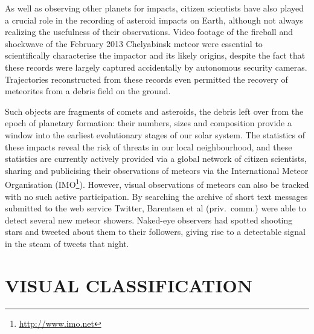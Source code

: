 \documentclass{ar2e}
\begin{document}

As well as observing other planets for impacts, citizen scientists have also
played a crucial role in the recording of asteroid impacts on Earth, although
not always realizing the usefulness of their observations. Video footage of
the fireball and shockwave of the February 2013 Chelyabinsk meteor
\citep{13popova} were essential to scientifically characterise the impactor and
its likely origins, despite the fact that these records were largely captured
accidentally by autonomous security cameras.  Trajectories reconstructed from
these records even permitted the recovery of meteorites from a debris field on
the ground.  

Such objects are fragments of comets and asteroids, the debris left over from
the epoch of planetary formation: their numbers, sizes and composition provide a
window into the earliest evolutionary stages of our solar system.  The
statistics of these impacts reveal the risk of threats in our local
neighbourhood, and these statistics are currently actively provided via a global
network of citizen scientists, sharing and publicising their observations of
meteors via the International Meteor Organisation
(IMO\footnote{\url{http://www.imo.net}}). However, visual observations of
meteors can also be tracked with no such active participation. By searching the
archive of short text messages submitted to the web service Twitter, Barentsen
et al (priv.\ comm.) were able to  detect several new meteor showers. Naked-eye
observers had spotted shooting stars and tweeted about them to their followers,
giving rise to a detectable signal in the steam of tweets that night. 




\section{VISUAL CLASSIFICATION}
\label{sec:class}
\end{document}
